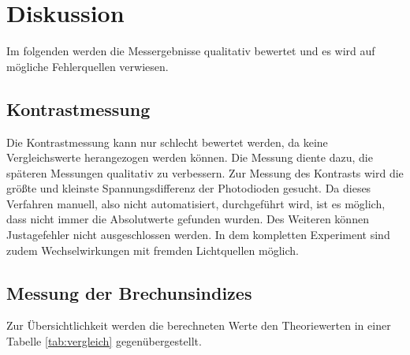 \section{Diskussion}
Im folgenden werden die Messergebnisse qualitativ bewertet und es wird auf
mögliche Fehlerquellen verwiesen.
\subsection{Kontrastmessung}
Die Kontrastmessung kann nur schlecht bewertet werden, da keine Vergleichswerte
herangezogen werden können. Die Messung diente dazu, die späteren Messungen
qualitativ zu verbessern. Zur Messung des Kontrasts wird die größte und kleinste
Spannungsdifferenz der Photodioden gesucht. Da dieses Verfahren manuell, also
nicht automatisiert, durchgeführt wird, ist es möglich, dass nicht immer die
Absolutwerte gefunden wurden. Des Weiteren können Justagefehler nicht
ausgeschlossen werden. In dem kompletten Experiment sind zudem
Wechselwirkungen mit fremden Lichtquellen möglich.

\subsection{Messung der Brechunsindizes}
Zur Übersichtlichkeit werden die berechneten Werte den Theoriewerten in einer
Tabelle \ref{tab:vergleich} gegenübergestellt.


